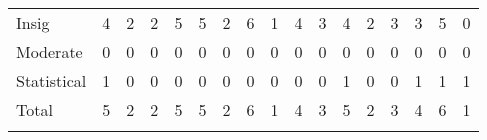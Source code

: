 \begin{tabular}{lcccccccccccccccc}
\hline \noalign{\smallskip}Insig & 4 & 2 & 2 & 5 & 5 & 2 & 6 & 1 & 4 & 3 & 4 & 2 & 3 & 3 & 5 & 0\\
Moderate & 0 & 0 & 0 & 0 & 0 & 0 & 0 & 0 & 0 & 0 & 0 & 0 & 0 & 0 & 0 & 0\\
Statistical & 1 & 0 & 0 & 0 & 0 & 0 & 0 & 0 & 0 & 0 & 1 & 0 & 0 & 1 & 1 & 1\\
Total & 5 & 2 & 2 & 5 & 5 & 2 & 6 & 1 & 4 & 3 & 5 & 2 & 3 & 4 & 6 & 1\\
\noalign{\smallskip}\hline\end{tabular}\\
